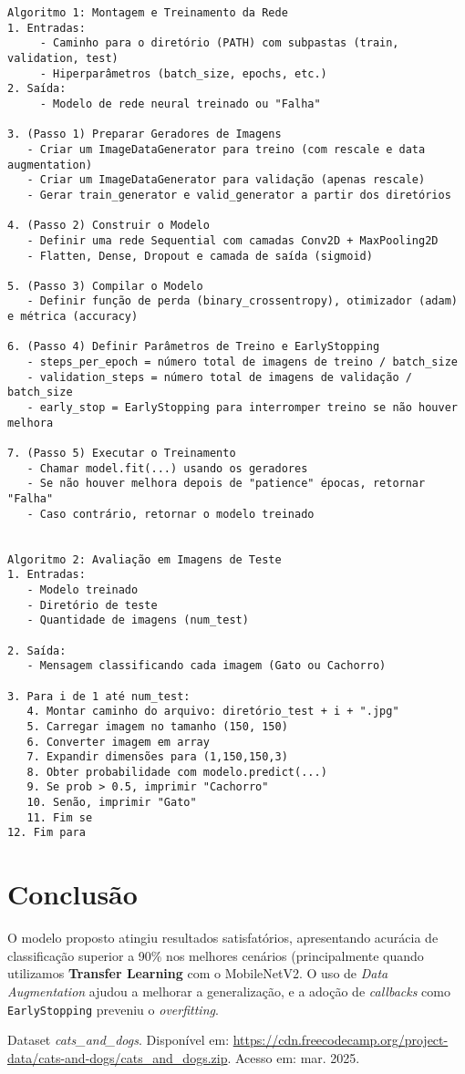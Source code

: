 \documentclass[a4paper,12pt]{article}
\begin{document}
\begin{verbatim}
Algoritmo 1: Montagem e Treinamento da Rede
1. Entradas: 
     - Caminho para o diretório (PATH) com subpastas (train, validation, test)
     - Hiperparâmetros (batch_size, epochs, etc.)
2. Saída: 
     - Modelo de rede neural treinado ou "Falha"

3. (Passo 1) Preparar Geradores de Imagens
   - Criar um ImageDataGenerator para treino (com rescale e data augmentation)
   - Criar um ImageDataGenerator para validação (apenas rescale)
   - Gerar train_generator e valid_generator a partir dos diretórios

4. (Passo 2) Construir o Modelo
   - Definir uma rede Sequential com camadas Conv2D + MaxPooling2D 
   - Flatten, Dense, Dropout e camada de saída (sigmoid)

5. (Passo 3) Compilar o Modelo
   - Definir função de perda (binary_crossentropy), otimizador (adam) e métrica (accuracy)

6. (Passo 4) Definir Parâmetros de Treino e EarlyStopping
   - steps_per_epoch = número total de imagens de treino / batch_size
   - validation_steps = número total de imagens de validação / batch_size
   - early_stop = EarlyStopping para interromper treino se não houver melhora

7. (Passo 5) Executar o Treinamento
   - Chamar model.fit(...) usando os geradores
   - Se não houver melhora depois de "patience" épocas, retornar "Falha"
   - Caso contrário, retornar o modelo treinado


Algoritmo 2: Avaliação em Imagens de Teste
1. Entradas:
   - Modelo treinado
   - Diretório de teste
   - Quantidade de imagens (num_test)

2. Saída:
   - Mensagem classificando cada imagem (Gato ou Cachorro)

3. Para i de 1 até num_test:
   4. Montar caminho do arquivo: diretório_test + i + ".jpg"
   5. Carregar imagem no tamanho (150, 150)
   6. Converter imagem em array
   7. Expandir dimensões para (1,150,150,3)
   8. Obter probabilidade com modelo.predict(...)
   9. Se prob > 0.5, imprimir "Cachorro"
   10. Senão, imprimir "Gato"
   11. Fim se
12. Fim para
\end{verbatim}

\section{Conclusão}
O modelo proposto atingiu resultados satisfatórios, apresentando acurácia de classificação superior a 90\% nos melhores cenários (principalmente quando utilizamos \textbf{Transfer Learning} com o MobileNetV2. O uso de \textit{Data Augmentation} ajudou a melhorar a generalização, e a adoção de \textit{callbacks} como \texttt{EarlyStopping} preveniu o \textit{overfitting}.

\begin{thebibliography}{1}

Dataset \textit{cats\_and\_dogs}. Disponível em: \url{https://cdn.freecodecamp.org/project-data/cats-and-dogs/cats_and_dogs.zip}. Acesso em: mar. 2025.

\end{thebibliography}
\end{document}
